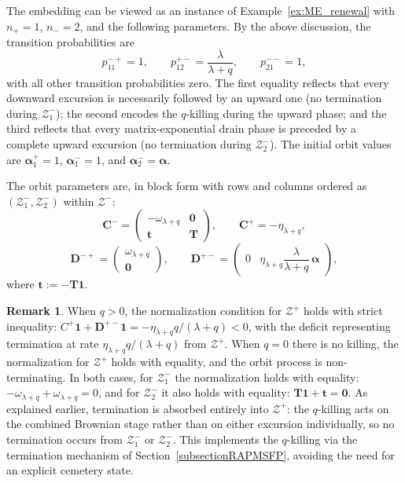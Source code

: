 \documentclass[a4paper,11pt]{article}
\numberwithin{equation}{section}
\theoremstyle{plain}
\theoremstyle{definition}
\newtheorem{remark}[theorem]{Remark}
\newcommand{\1}{\mathbf{1}}
\begin{document}
The embedding can be viewed as an instance of Example~\ref{ex:ME_renewal} with $n_+=1$, $n_-=2$, and the following parameters. 
By the above discussion, the transition probabilities are
\[
p^{-+}_{11} = 1, \qquad p^{+-}_{12} = \frac{\lambda}{\lambda+q}, \qquad p^{--}_{21} = 1,
\]
with all other transition probabilities zero. The first equality reflects that every downward excursion is necessarily followed by an upward one (no termination during $\mathcal{Z}_1^-$); the second encodes the $q$-killing during the upward phase; and the third reflects that every matrix-exponential drain phase is preceded by a complete upward excursion (no termination during $\mathcal{Z}_2^-$). The initial orbit values are $\bm{\alpha}_1^+ = 1$, $\bm{\alpha}_1^- = 1$, and $\bm{\alpha}_2^- = \bm{\alpha}$.



The orbit parameters are, in block form with rows and columns ordered as $(\mathcal{Z}_1^-, \mathcal{Z}_2^-)$ within $\mathcal{Z}^-$:
\begin{equation}\label{eq:params_ubv}
\bm{C}^- = \begin{pmatrix} -\omega_{\lambda+q} & \bm{0} \\ \bm{t} & \bm{T} \end{pmatrix}, \qquad \bm{C}^+ = -\eta_{\lambda+q},
\end{equation}
\begin{equation}\label{eq:params_ubv1}
\bm{D}^{-+} = \begin{pmatrix} \omega_{\lambda+q} \\ \bm{0} \end{pmatrix}, \qquad \bm{D}^{+-} = \begin{pmatrix} 0 & \eta_{\lambda+q}\dfrac{\lambda}{\lambda+q}\,\bm{\alpha} \end{pmatrix},
\end{equation}
where $\bm{t} := -\bm{T}\bm{1}$.

\begin{remark}
When $q>0$, the normalization condition for $\mathcal{Z}^+$ holds with strict inequality: $C^+\bm{1} + \bm{D}^{+-}\bm{1} = -\eta_{\lambda+q}q/(\lambda+q) < 0$, with the deficit representing termination at rate $\eta_{\lambda+q}q/(\lambda+q)$ from $\mathcal{Z}^+$. When $q=0$ there is no killing, the normalization for $\mathcal{Z}^+$ holds with equality, and the orbit process is non-terminating. In both cases, for $\mathcal{Z}_1^-$ the normalization holds with equality: $-\omega_{\lambda+q} + \omega_{\lambda+q} = 0$, and for $\mathcal{Z}_2^-$ it also holds with equality: $\bm{T}\bm{1} + \bm{t} = \bm{0}$. As explained earlier, termination is absorbed entirely into $\mathcal{Z}^+$: the $q$-killing acts on the combined Brownian stage rather than on either excursion individually, so no termination occurs from $\mathcal{Z}_1^-$ or $\mathcal{Z}_2^-$. This implements the $q$-killing via the termination mechanism of Section~\ref{subsectionRAPMSFP}, avoiding the need for an explicit cemetery state.
\end{remark}
\end{document}
